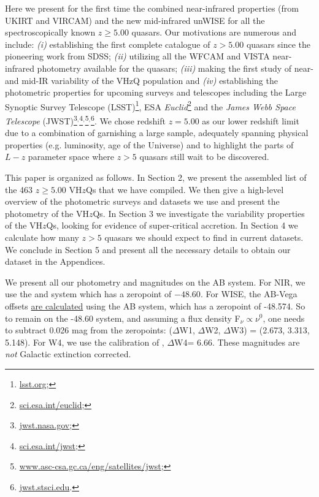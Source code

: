 \documentclass[usenatbib]{mnras}
\begin{document}
Here we present for the first time the combined near-infrared
properties (from UKIRT and VIRCAM) and the new mid-infrared unWISE for
all the spectroscopically known $z\geq5.00$ quasars. Our motivations
are numerous and include: {\it (i)} establishing the first complete
catalogue of $z>5.00$ quasars since the pioneering work from SDSS;
{\it (ii)} utilizing all the WFCAM and VISTA near-infrared photometry
available for the quasars; {\it (iii)} making the first study of near-
and mid-IR variability of the VHzQ population and {\it (iv)}
establishing the photometric properties for upcoming surveys and
telescopes including the Large Synoptic Survey Telescope
(LSST)\footnote{\href{https://www.lsst.org}{lsst.org};}, ESA {\it
Euclid}\footnote{\href{https://sci.esa.int/euclid/}{sci.esa.int/euclid};}
and the {\it James Webb Space Telescope}
(JWST)\footnote{\href{https://www.jwst.nasa.gov/}{jwst.nasa.gov};}$^,$\footnote{\href{https://sci.esa.int/jwst/}{sci.esa.int/jwst};}$^,$\footnote{\href{https://www.asc-csa.gc.ca/eng/satellites/jwst/}{www.asc-csa.gc.ca/eng/satellites/jwst};}$^,$\footnote{\href{https://jwst.stsci.edu/}{jwst.stsci.edu}.}. We
chose redshift $z=5.00$ as our lower redshift limit due to a
combination of garnishing a large sample, adequately spanning physical
properties (e.g. luminosity, age of the Universe) and to highlight the
parts of $L-z$ parameter space where $z>5$ quasars still wait to be
discovered.

This paper is organized as follows. In Section 2, we present the
assembled list of the 463 $z\geq5.00$ VH$z$Qs that we have
compiled. We then give a high-level overview of the photometric
surveys and datasets we use and present the photometry of the
VH$z$Qs. In Section 3 we investigate the variability properties of the
VH$z$Qs, looking for evidence of super-critical accretion. In Section
4 we calculate how many $z>5$ quasars we should expect to find in
current datasets. We conclude in Section 5 and present all the
necessary details to obtain our dataset in the Appendices.

We present all our photometry and magnitudes on the AB system. For NIR, we use the \citet{Oke_Gunn1983} and \citet{Fukugita1996} system which has a zeropoint of $-48.60$. 
For WISE, the AB-Vega offsets \href{http://wise2.ipac.caltech.edu/docs/release/allsky/expsup/sec4_4h.html#conv2ab}{are calculated} using the \citet{TokunagaVacca2005} AB system, which has a zeropoint of -48.574. So to remain on the -48.60 system, and assuming a flux density F$_{\nu} \propto \nu^{0}$, one needs to subtract 0.026 mag from the zeropoints: 
($\Delta$W1, $\Delta$W2, $\Delta$W3) = (2.673, 3.313, 5.148). 
For W4, we use the calibration of \citet{Brown2014b}, $\Delta$W4= 6.66. 
These magnitudes are {\it not} Galactic extinction corrected. 
\end{document}
